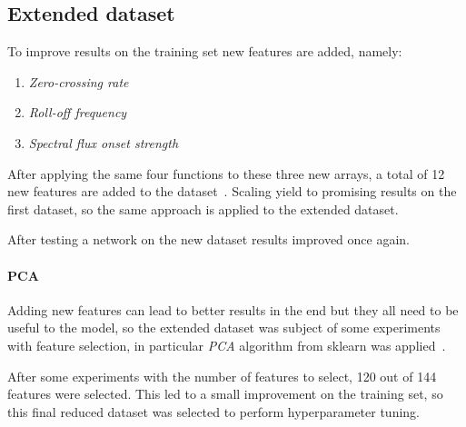 \subsection{Extended dataset}
\label{extended-dataset}

To improve results on the training set new features are added, namely: 
\begin{enumerate}
    \item \emph{Zero-crossing rate}
    \item \emph{Roll-off frequency}
    \item \emph{Spectral flux onset strength}
\end{enumerate}
After applying the same four functions to these three new arrays, 
a total of 12 new features are added to the dataset~\cite{librosa-ex}.
Scaling yield to promising results on the first dataset, 
so the same approach is applied to the extended dataset.

After testing a network on the new dataset results improved once again.

\paragraph{PCA}
Adding new features can lead to better results 
in the end but they all need to be useful to the model, so 
the extended dataset was subject of some experiments with feature selection, 
in particular \emph{PCA} algorithm from sklearn was applied~\cite{pca}.

After some experiments with the number of features to select, 120 out of 144 
features were selected. This led to a small improvement on the training set, 
so this final reduced dataset was selected to perform hyperparameter tuning.

\newpage